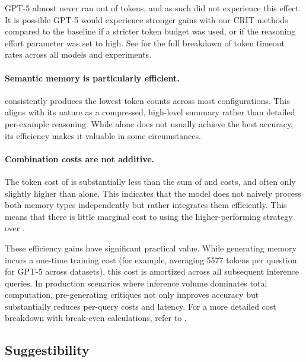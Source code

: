 GPT-5 almost never ran out of tokens, and as such did not experience this effect. It is possible GPT-5 would experience stronger gains with our CRIT methods compared to the \EPLABEL{} baseline if a stricter token budget was used, or if the reasoning effort parameter was set to high. See  for the full breakdown of token timeout rates across all models and experiments.

\paragraph{Semantic memory is particularly efficient.}
\SEMCRIT{} consistently produces the lowest token counts across most configurations. This aligns with its nature as a compressed, high-level summary rather than detailed per-example reasoning. While \SEMCRIT{} alone does not usually achieve the best accuracy, its efficiency makes it valuable in some circumstances.

\paragraph{Combination costs are not additive.}
The token cost of \EPSEMCRIT{} is substantially less than the sum of \EPCRIT{} and \SEMCRIT{} costs, and often only slightly higher than \EPCRIT{} alone. This indicates that the model does not naively process both memory types independently but rather integrates them efficiently. This means that there is little marginal cost to using the higher-performing \EPSEMCRIT{} strategy over \EPCRIT{}.

These efficiency gains have significant practical value. While generating memory incurs a one-time training cost (for example, averaging 5577 tokens per question for GPT-5 across datasets), this cost is amortized across all subsequent inference queries. In production scenarios where inference volume dominates total computation, pre-generating critiques not only improves accuracy but substantially reduces per-query costs and latency.  For a more detailed cost breakdown with break-even calculations, refer to .

\subsection{Suggestibility}

